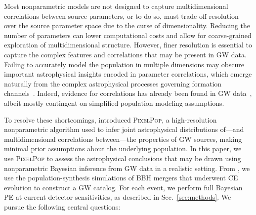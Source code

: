 \documentclass[twocolumn, twocolappendix]{aastex631}
\newcommand{\PixelPop}{\textsc{PixelPop}\xspace}
\begin{document}
Most nonparametric models are not designed to capture multidimensional correlations between source parameters, or to do so, must trade off resolution over the source parameter space due to the curse of dimensionality. Reducing the number of parameters can lower computational costs and allow for coarse-grained exploration of multidimensional structure. However, finer resolution is essential to capture the complex features and correlations that may be present in \ac{GW} data.
Failing to accurately model the population in multiple dimensions may obscure important astrophysical insights encoded in parameter correlations, which emerge naturally from the complex astrophysical processes governing formation channels~\citep{Bavera:2020uch,Bavera:2022mef,Gerosa:2021mno,Santini:2023ukl,Baibhav:2022qxm,vanSon:2021zpk,Zevin:2022wrw,Broekgaarden:2022nst,Bavera:2020inc}. Indeed, evidence for correlations has already been found in \ac{GW} data~\citep{Callister:2021fpo, Biscoveanu:2022qac, Adamcewicz:2022hce, Heinzel:2023hlb, Heinzel:2024hva, Franciolini:2022iaa, Ray:2024hos,Antonini:2024het,Hussain:2024qzl,Pierra:2024fbl,Tiwari:2021yvr,Li:2023yyt}, albeit mostly contingent on simplified population modeling assumptions.

To resolve these shortcomings, \citet{Heinzel:2024jlc, Heinzel:2024hva} introduced \PixelPop, a high-resolution nonparametric algorithm used to infer joint astrophysical distributions of---and multidimensional correlations between---the properties of GW sources, making minimal prior assumptions about the underlying population. In this paper, we use \PixelPop to assess the astrophysical conclusions that may be drawn using nonparametric Bayesian inference from GW data in a realistic setting. From \citet{Zevin:2020gbd}, we use the population-synthesis simulations of \ac{BBH} mergers that underwent \ac{CE} evolution to construct a GW catalog. For each event, we perform full Bayesian \ac{PE} at current detector sensitivities, as described in Sec.~\ref{sec:methods}. We pursue the following central questions:
\end{document}
